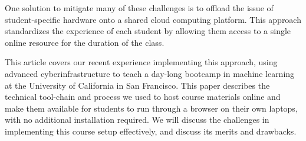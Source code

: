 One solution to mitigate many of these challenges is to offload the issue of
student-specific hardware onto a shared cloud computing platform. This approach
standardizes the experience of each student by allowing them access to a single
online resource for the duration of the class.

This article covers our recent experience implementing this approach, using
advanced cyberinfrastructure to teach a day-long bootcamp in machine learning at
the University of California in San Francisco. This paper describes the
technical tool-chain and process we used to host course materials online and
make them available for students to run through a browser on their own laptops,
with no additional installation required. We will discuss the challenges in
implementing this course setup effectively, and discuss its merits and
drawbacks.
